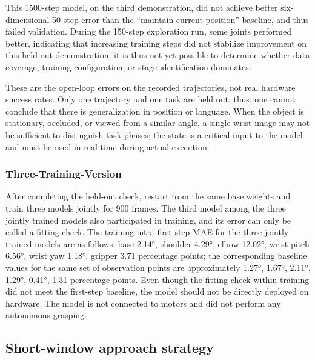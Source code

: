 
This 1500-step model, on the third demonstration, did not achieve better six-dimensional 50-step error than the ``maintain current position'' baseline, and thus failed validation. During the 150-step exploration run, some joints performed better, indicating that increasing training steps did not stabilize improvement on this held-out demonstration; it is thus not yet possible to determine whether data coverage, training configuration, or stage identification dominates.

These are the open-loop errors on the recorded trajectories, not real hardware success rates. Only one trajectory and one task are held out; thus, one cannot conclude that there is generalization in position or language. When the object is stationary, occluded, or viewed from a similar angle, a single wrist image may not be sufficient to distinguish task phases; the state is a critical input to the model and must be used in real-time during actual execution.

\subsubsection{Three-Training-Version}\label{s07-detail-8}

After completing the held-out check, restart from the same base weights and train three models jointly for 900 frames. The third model among the three jointly trained models also participated in training, and its error can only be called a fitting check. The training-intra first-step MAE for the three jointly trained models are as follows: base 2.14°, shoulder 4.29°, elbow 12.02°, wrist pitch 6.56°, wrist yaw 1.18°, gripper 3.71 percentage points; the corresponding baseline values for the same set of observation points are approximately 1.27°, 1.67°, 2.11°, 1.29°, 0.41°, 1.31 percentage points. Even though the fitting check within training did not meet the first-step baseline, the model should not be directly deployed on hardware. The model is not connected to motors and did not perform any autonomous grasping.



\subsection{Short-window approach strategy}\label{s07-detail-9}

